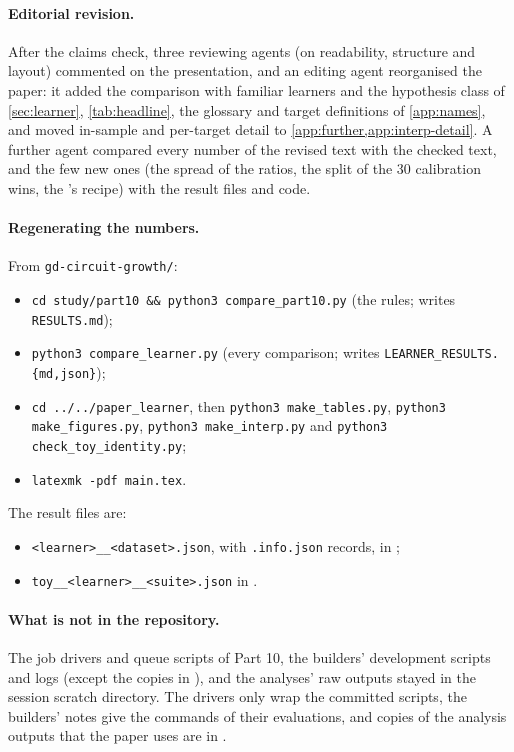 \paragraph{Editorial revision.} After the claims check, three reviewing agents (on readability, structure and layout) commented on the presentation, and an editing agent reorganised the paper: it added the comparison with familiar learners and the hypothesis class of \cref{sec:learner}, \cref{tab:headline}, the glossary and target definitions of \cref{app:names}, and moved in-sample and per-target detail to \cref{app:further,app:interp-detail}. A further agent compared every number of the revised text with the checked text, and the few new ones (the spread of the  ratios, the split of the 30 calibration wins, the 's recipe) with the result files and code.

\paragraph{Regenerating the numbers.} From \texttt{gd-circuit-growth/}:
\begin{itemize}\raggedright
\item \texttt{cd study/part10 \&\& python3 compare\_part10.py} (the rules; writes \texttt{RESULTS.md});
\item \texttt{python3 compare\_learner.py} (every comparison; writes \texttt{LEARNER\_RESULTS.\{md,json\}});
\item \texttt{cd ../../paper\_learner}, then \texttt{python3 make\_tables.py}, \texttt{python3 make\_figures.py}, \texttt{python3 make\_interp.py} and \texttt{python3 check\_toy\_identity.py};
\item \texttt{latexmk -pdf main.tex}.
\end{itemize}
The result files are:
\begin{itemize}\raggedright
\item \texttt{<learner>\_\_<dataset>.json}, with \texttt{.info.json} records, in ;
\item \texttt{toy\_\_<learner>\_\_<suite>.json} in .
\end{itemize}

\paragraph{What is not in the repository.} The job drivers and queue scripts of Part 10, the builders' development scripts and logs (except the copies in ), and the analyses' raw outputs stayed in the session scratch directory. The drivers only wrap the committed scripts, the builders' notes give the commands of their evaluations, and copies of the analysis outputs that the paper uses are in .
